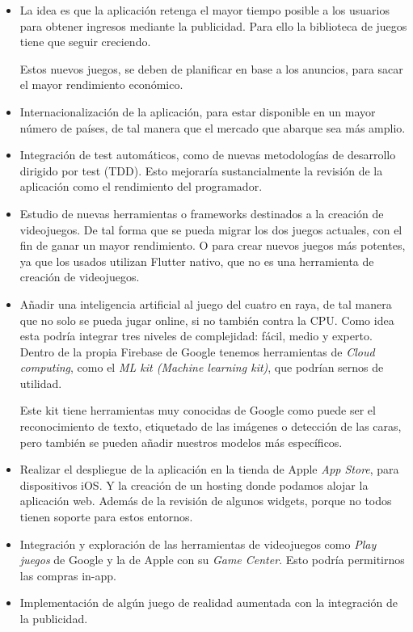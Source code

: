 \begin{itemize}
\item La idea es que la aplicación retenga el mayor tiempo posible a los usuarios para obtener ingresos mediante la publicidad. Para ello la biblioteca de juegos tiene que seguir creciendo. 

Estos nuevos juegos, se deben de planificar en base a los anuncios, para sacar el mayor rendimiento económico.

\item Internacionalización de la aplicación, para estar disponible en un mayor número de países, de tal manera que el mercado que abarque sea más amplio.

\item Integración de test automáticos, como de nuevas metodologías de desarrollo dirigido por test (TDD). Esto mejoraría sustancialmente la revisión de la aplicación como el rendimiento del programador.

\item Estudio de nuevas herramientas o frameworks destinados a la creación de videojuegos. De tal forma que se pueda migrar los dos juegos actuales, con el fin de ganar un mayor rendimiento. O para crear nuevos juegos más potentes, ya que los usados utilizan Flutter nativo, que no es una herramienta de creación de videojuegos.

\item Añadir una inteligencia artificial al juego del cuatro en raya, de tal manera que no solo se pueda jugar online, si no también contra la CPU. Como idea esta podría integrar tres niveles de complejidad: fácil, medio y experto. Dentro de la propia Firebase de Google tenemos herramientas de \emph{Cloud computing}, como el \emph{ML kit (Machine learning kit)}, que podrían sernos de utilidad. 

Este kit tiene herramientas muy conocidas de Google como puede ser el reconocimiento de texto, etiquetado de las imágenes o detección de las caras, pero también se pueden añadir nuestros modelos más específicos.

\item Realizar el despliegue de la aplicación en la tienda de Apple \emph{App Store}, para dispositivos iOS. Y la creación de un hosting donde podamos alojar la aplicación web. Además de la revisión de algunos widgets, porque no todos tienen soporte para estos entornos.
	
\item Integración y exploración de las herramientas de videojuegos como \emph{Play juegos} de Google y la de Apple con su \emph{Game Center}. Esto podría permitirnos las compras in-app.

\item Implementación de algún juego de realidad aumentada con la integración de la publicidad.
\end{itemize}